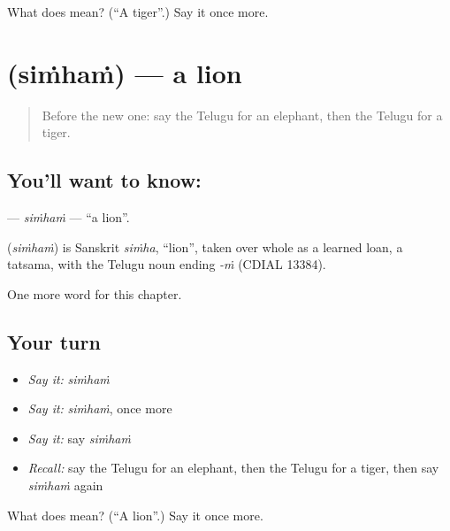 \begin{tcolorbox}[breakable,colback=teal!4,colframe=teal!35!black,title={Before you move on}]
What does  mean? (\textquotedblleft{}A tiger\textquotedblright{}.) Say it once more.
\end{tcolorbox}
\section[\texorpdfstring{\te{సింహం} (siṁhaṁ)}{సింహం (siṁhaṁ)}]{ (siṁhaṁ) — a lion}

\label{lesson:TE-C123-simham}



\begin{quote}
Before the new one: say the Telugu for an elephant, then the Telugu for a tiger.
\end{quote}

\subsection*{You'll want to know: }
\textbf{} — \emph{siṁhaṁ} — \textquotedblleft{}a lion\textquotedblright{}.

\begin{cousinweb}
\textbf{} (\emph{siṁhaṁ}) is Sanskrit \emph{siṁha}, \textquotedblleft{}lion\textquotedblright{}, taken over whole as a learned loan, a tatsama, with the Telugu noun ending \emph{-ṁ} (CDIAL 13384).
\end{cousinweb}

\begin{grammarlens}[title={What you've built}]
One more word for this chapter.
\end{grammarlens}

\subsection*{Your turn}
\begin{itemize}
\raggedright
  \item \emph{Say it:} \emph{siṁhaṁ}
  \item \emph{Say it:} \emph{siṁhaṁ}, once more
  \item \emph{Say it:} say \emph{siṁhaṁ}
  \item \emph{Recall:} say the Telugu for an elephant, then the Telugu for a tiger, then say \emph{siṁhaṁ} again
\end{itemize}

\begin{tcolorbox}[breakable,colback=teal!4,colframe=teal!35!black,title={Before you move on}]
What does  mean? (\textquotedblleft{}A lion\textquotedblright{}.) Say it once more.
\end{tcolorbox}
